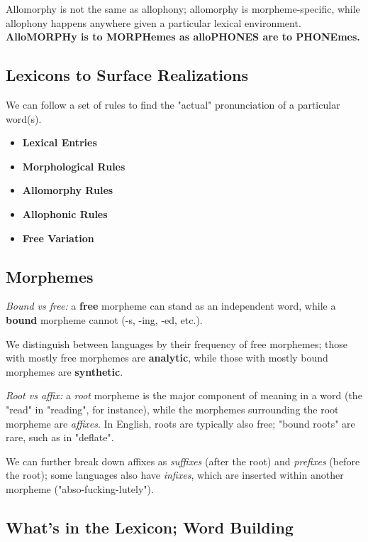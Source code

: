 \documentclass[12pt]{article}
\begin{document}
Allomorphy is not the same as allophony; allomorphy is morpheme-specific, while allophony happens anywhere given a particular lexical environment. \textbf{AlloMORPHy is to MORPHemes as alloPHONES are to PHONEmes.}

\subsection{Lexicons to Surface Realizations}

We can follow a set of rules to find the "actual" pronunciation of a particular word(s).

\begin{itemize}
  \item \textbf{Lexical Entries}
  \item \textbf{Morphological Rules}
  \item \textbf{Allomorphy Rules}
  \item \textbf{Allophonic Rules}
  \item \textbf{Free Variation}
\end{itemize}


\subsection{Morphemes}

\textit{Bound vs free:} a \textbf{free} morpheme can stand as an independent word, while a \textbf{bound} morpheme cannot (-s, -ing, -ed, etc.).

We distinguish between languages by their frequency of free morphemes; those with mostly free morphemes are \textbf{analytic}, while those with mostly bound morphemes are \textbf{synthetic}.

\textit{Root vs affix:} a \textit{root} morpheme is the major component of meaning in a word (the "read" in "reading", for instance), while the morphemes surrounding the root morpheme are \textit{affixes}. In English, roots are typically also free; "bound roots" are rare, such as in "deflate".

We can further break down affixes as \textit{suffixes} (after the root) and \textit{prefixes} (before the root); some languages also have \textit{infixes}, which are inserted within another morpheme ("abso-fucking-lutely").

\subsection{What's in the Lexicon; Word Building}
\end{document}
